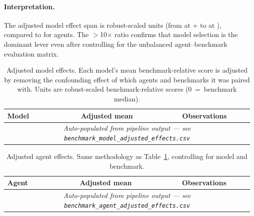 \paragraph{Interpretation.}
The adjusted model effect span is \ModelEffectSpan{} robust-scaled units (from
\TopModel{} at $+$\TopModelEffect{} to \BottomModel{} at
\BottomModelEffect{}), compared to \AgentEffectSpan{} for agents.  The
$>$10$\times$ ratio confirms that model selection is the dominant lever even
after controlling for the unbalanced agent--benchmark evaluation matrix.

\begin{table}[t]
  \centering
  \caption{Adjusted model effects.  Each model's mean benchmark-relative score
    is adjusted by removing the confounding effect of which agents and
    benchmarks it was paired with.  Units are robust-scaled benchmark-relative
    scores (0~=~benchmark median).}
  \label{tab:adjusted-model-effects}
  \small
  \begin{tabular}{lcc}
    \toprule
    Model & Adjusted mean & Observations \\
    \midrule
    \multicolumn{3}{c}{\emph{Auto-populated from pipeline output ---
      see \texttt{benchmark\_model\_adjusted\_effects.csv}}} \\
    \bottomrule
  \end{tabular}
\end{table}

\begin{table}[t]
  \centering
  \caption{Adjusted agent effects.  Same methodology as
    Table~\ref{tab:adjusted-model-effects}, controlling for model and
    benchmark.}
  \label{tab:adjusted-agent-effects}
  \small
  \begin{tabular}{lcc}
    \toprule
    Agent & Adjusted mean & Observations \\
    \midrule
    \multicolumn{3}{c}{\emph{Auto-populated from pipeline output ---
      see \texttt{benchmark\_agent\_adjusted\_effects.csv}}} \\
    \bottomrule
  \end{tabular}
\end{table}
